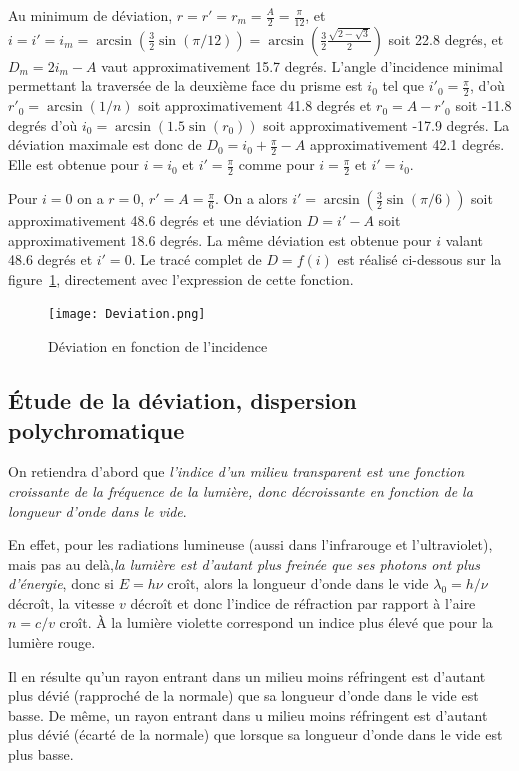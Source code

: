 Au minimum de déviation, \(r=r'=r_m=\frac{A}{2}=\frac{\pi}{12}\), et \(i=i'=i_m=\arcsin\left(\frac{3}{2}\sin(\pi/12)\right) = \arcsin\left(\frac{3}{2} \frac{\sqrt{2-\sqrt{3}}}{2}\right)\) soit 22.8 degrés, et \(D_m=2i_m-A\) vaut approximativement 15.7 degrés.
L'angle d'incidence minimal permettant la traversée de la deuxième face du prisme est \(i_0\) tel que \(i'_0=\frac{\pi}{2}\), d'où \(r'_0 = \arcsin(1/n)\) soit approximativement 41.8 degrés et \(r_0=A-r'_0\) soit -11.8 degrés d'où \(i_0=\arcsin(1.5 \sin(r_0))\) soit approximativement -17.9 degrés. La déviation maximale est donc de \(D_0 = i_0 + \frac{\pi}{2}-A\) approximativement 42.1 degrés. Elle est obtenue pour \(i=i_0\) et \(i'=\frac{\pi}{2}\) comme pour \(i=\frac{\pi}{2}\) et \(i'=i_0\).

Pour \(i=0\) on a \(r=0\), \(r'=A=\frac{\pi}{6}\). On a alors \(i'=\arcsin(\frac{3}{2}\sin(\pi/6))\) soit approximativement 48.6 degrés et une déviation \(D=i'-A\) soit approximativement 18.6 degrés. La même déviation est obtenue pour \(i\) valant 48.6 degrés et \(i'=0\).
Le tracé complet de \(D=f(i)\) est réalisé ci-dessous sur la figure~\ref{fig:chap6-deviation}, directement avec l'expression de cette fonction.
\begin{figure}
    \centering
    \texttt{[image: Deviation.png]}
    \caption{Déviation en fonction de l'incidence}
    \label{fig:chap6-deviation}
\end{figure}
\subsection{Étude de la déviation, dispersion polychromatique}

On retiendra d'abord que \emph{l'indice d'un milieu transparent est une fonction croissante de la fréquence de la lumière, donc décroissante en fonction de la longueur d'onde dans le vide}.

En effet, pour les radiations lumineuse (aussi dans l'infrarouge et l'ultraviolet), mais pas au delà,\emph{la lumière est d'autant plus freinée que ses photons ont plus d'énergie}, donc si \(E=h \nu\) croît, alors la longueur d'onde dans le vide \(\lambda_0 = h/\nu\) décroît, la vitesse \(v\) décroît et donc l'indice de réfraction par rapport à l'aire \(n=c/v\) croît. À la lumière violette correspond un indice plus élevé que pour la lumière rouge.

Il en résulte qu'un rayon entrant dans un milieu moins réfringent est d'autant plus dévié (rapproché de la normale) que sa longueur d'onde dans le vide est basse. De même, un rayon entrant dans u milieu moins réfringent est d'autant plus dévié (écarté de la normale) que lorsque sa longueur d'onde dans le vide est plus basse.

